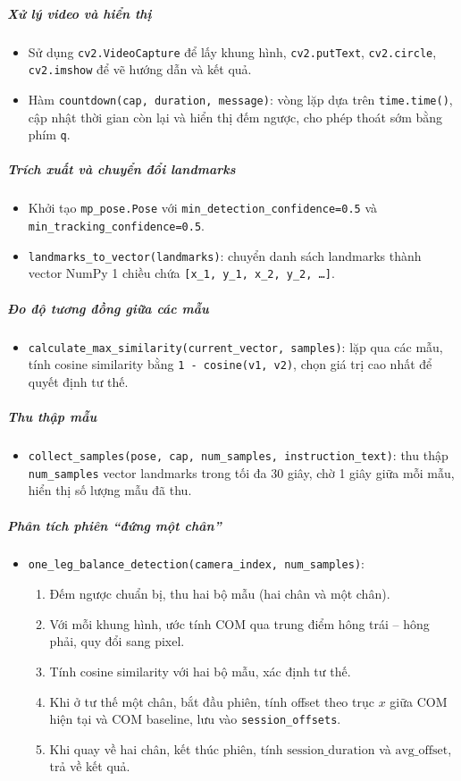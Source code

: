 \subparagraph{Xử lý video và hiển thị}
\begin{itemize}
  \item Sử dụng \texttt{cv2.VideoCapture} để lấy khung hình, \texttt{cv2.putText}, \texttt{cv2.circle}, \texttt{cv2.imshow} để vẽ hướng dẫn và kết quả.
  \item Hàm \texttt{countdown(cap, duration, message)}: vòng lặp dựa trên \texttt{time.time()}, cập nhật thời gian còn lại và hiển thị đếm ngược, cho phép thoát sớm bằng phím \texttt{q}.
\end{itemize}

\subparagraph{Trích xuất và chuyển đổi landmarks}
\begin{itemize}
  \item Khởi tạo \texttt{mp\_pose.Pose} với \texttt{min\_detection\_confidence=0.5} và \texttt{min\_tracking\_confidence=0.5}.
  \item \texttt{landmarks\_to\_vector(landmarks)}: chuyển danh sách landmarks thành vector NumPy 1 chiều chứa \texttt{[x\_1, y\_1, x\_2, y\_2, \dots]}.
\end{itemize}

\subparagraph{Đo độ tương đồng giữa các mẫu}
\begin{itemize}
  \item \texttt{calculate\_max\_similarity(current\_vector, samples)}: lặp qua các mẫu, tính cosine similarity bằng \texttt{1 - cosine(v1, v2)}, chọn giá trị cao nhất để quyết định tư thế.
\end{itemize}

\subparagraph{Thu thập mẫu}
\begin{itemize}
  \item \texttt{collect\_samples(pose, cap, num\_samples, instruction\_text)}: thu thập \texttt{num\_samples} vector landmarks trong tối đa 30 giây, chờ 1 giây giữa mỗi mẫu, hiển thị số lượng mẫu đã thu.
\end{itemize}

\subparagraph{Phân tích phiên “đứng một chân”}
\begin{itemize}
  \item \texttt{one\_leg\_balance\_detection(camera\_index, num\_samples)}:
    \begin{enumerate}
      \item Đếm ngược chuẩn bị, thu hai bộ mẫu (hai chân và một chân).
      \item Với mỗi khung hình, ước tính COM qua trung điểm hông trái – hông phải, quy đổi sang pixel.
      \item Tính cosine similarity với hai bộ mẫu, xác định tư thế.
      \item Khi ở tư thế một chân, bắt đầu phiên, tính offset theo trục \(x\) giữa COM hiện tại và COM baseline, lưu vào \texttt{session\_offsets}.
      \item Khi quay về hai chân, kết thúc phiên, tính \(\text{session\_duration}\) và \(\text{avg\_offset}\), trả về kết quả.
    \end{enumerate}
\end{itemize}

